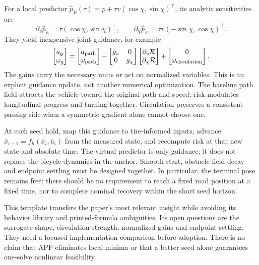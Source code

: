 \documentclass[10pt]{article}
\begin{document}
For a local predictor
$\hat p_E(\tau)=p+\tau v(\cos\chi,\sin\chi)^\top$, its analytic sensitivities are
\[
 \partial_v\hat p_E=\tau(\cos\chi,\sin\chi)^\top,\qquad
 \partial_\chi\hat p_E=\tau v(-\sin\chi,\cos\chi)^\top.
\]
They yield inexpensive joint guidance, for example
\[
 \begin{bmatrix}a_g\\\omega_g\end{bmatrix}
 =
 \begin{bmatrix}a_{\rm path}\\\omega_{\rm path}\end{bmatrix}
 -
 \begin{bmatrix}g_v&0\\0&g_\chi\end{bmatrix}
 \begin{bmatrix}\partial_v{\cal R}\\\partial_\chi{\cal R}\end{bmatrix}
 +\begin{bmatrix}0\\\omega_{\rm circulation}\end{bmatrix}.
\]
The gains carry the necessary units or act on normalized variables.
This is an explicit guidance update, not another numerical optimization.
The baseline path field attracts the vehicle toward the original path and
speed; risk modulates longitudinal progress and turning together.
Circulation preserves a consistent passing side when a symmetric gradient
alone cannot choose one.

At each seed hold, map this guidance to tire-informed inputs, advance
$\bar x_{i+1}=f_h(\bar x_i,\bar u_i)$ from the measured state, and recompute
risk at that new state and absolute time. The virtual predictor is only
guidance; it does not replace the bicycle dynamics in the anchor.
Smooth start, obstacle-field decay and endpoint settling must be designed
together. In particular, the terminal pose remains free: there should be no
requirement to reach a fixed road position at a fixed time, nor to complete
nominal recovery within the short seed horizon.

This template transfers the paper's most relevant insight while avoiding its
behavior library and printed-formula ambiguities. Its open questions are
the surrogate shape, circulation strength, normalized gains and endpoint
settling. They need a focused implementation comparison before adoption.
There is no claim that APF eliminates local minima or that a better seed
alone guarantees one-solve nonlinear feasibility.
\end{document}
